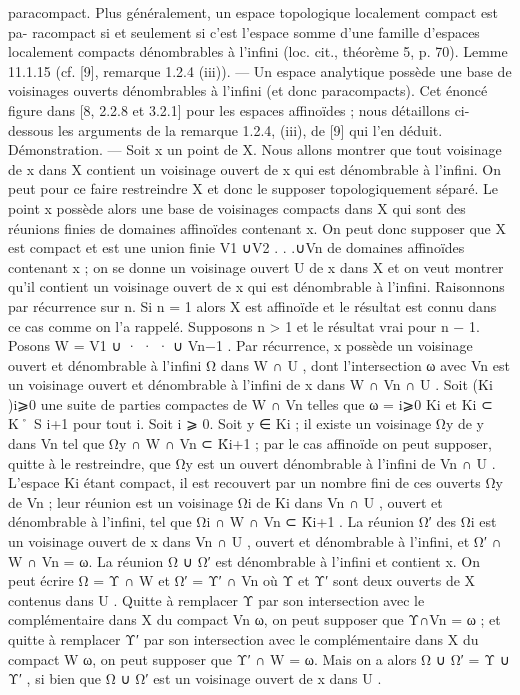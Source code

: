\documentclass[
  10pt,
]{article}
\newenvironment{Shaded}{}{}
\newcommand{\NormalTok}[1]{#1}
\begin{document}
\begin{Shaded}
\begin{Highlighting}[]
\NormalTok{paracompact. Plus généralement, un espace topologique localement compact est pa{-}}
\NormalTok{racompact si et seulement si c’est l’espace somme d’une famille d’espaces localement}
\NormalTok{compacts dénombrables à l’infini (loc. cit., théorème 5, p. 70).}
\NormalTok{Lemme 11.1.15 (cf. [9], remarque 1.2.4 (iii)). — Un espace analytique possède}
\NormalTok{une base de voisinages ouverts dénombrables à l’infini (et donc paracompacts).}
\NormalTok{   Cet énoncé figure dans [8, 2.2.8 et 3.2.1] pour les espaces affinoïdes ; nous détaillons}
\NormalTok{ci{-}dessous les arguments de la remarque 1.2.4, (iii), de [9] qui l’en déduit.}
\NormalTok{Démonstration. — Soit x un point de X. Nous allons montrer que tout voisinage de x}
\NormalTok{dans X contient un voisinage ouvert de x qui est dénombrable à l’infini. On peut pour}
\NormalTok{ce faire restreindre X et donc le supposer topologiquement séparé. Le point x possède}
\NormalTok{alors une base de voisinages compacts dans X qui sont des réunions finies de domaines}
\NormalTok{affinoïdes contenant x. On peut donc supposer que X est compact et est une union finie}
\NormalTok{V1 ∪V2 . . .∪Vn de domaines affinoïdes contenant x ; on se donne un voisinage ouvert U de}
\NormalTok{x dans X et on veut montrer qu’il contient un voisinage ouvert de x qui est dénombrable}
\NormalTok{à l’infini. Raisonnons par récurrence sur n. Si n = 1 alors X est affinoïde et le résultat}
\NormalTok{est connu dans ce cas comme on l’a rappelé. Supposons n \textgreater{} 1 et le résultat vrai pour}
\NormalTok{n − 1. Posons W = V1 ∪ · · · ∪ Vn−1 . Par récurrence, x possède un voisinage ouvert et}
\NormalTok{dénombrable à l’infini Ω dans W ∩ U , dont l’intersection ω avec Vn est un voisinage}
\NormalTok{ouvert et dénombrable à l’infini de x dans W ∩ Vn ∩ U . Soit (Ki )i⩾0 une suite de parties}
\NormalTok{compactes de W ∩ Vn telles que ω = i⩾0 Ki et Ki ⊂ K˚}
\NormalTok{                                       S}
\NormalTok{                                                           i+1 pour tout i. Soit i ⩾ 0. Soit}
\NormalTok{y ∈ Ki ; il existe un voisinage Ωy de y dans Vn tel que Ωy ∩ W ∩ Vn ⊂ K̊i+1 ; par le cas}
\NormalTok{affinoïde on peut supposer, quitte à le restreindre, que Ωy est un ouvert dénombrable}
\NormalTok{à l’infini de Vn ∩ U . L’espace Ki étant compact, il est recouvert par un nombre fini de}
\NormalTok{ces ouverts Ωy de Vn ; leur réunion est un voisinage Ωi de Ki dans Vn ∩ U , ouvert et}
\NormalTok{dénombrable à l’infini, tel que Ωi ∩ W ∩ Vn ⊂ K̊i+1 . La réunion Ω′ des Ωi est un voisinage}
\NormalTok{ouvert de x dans Vn ∩ U , ouvert et dénombrable à l’infini, et Ω′ ∩ W ∩ Vn = ω. La réunion}
\NormalTok{Ω ∪ Ω′ est dénombrable à l’infini et contient x. On peut écrire Ω = Υ ∩ W et Ω′ = Υ′ ∩ Vn}
\NormalTok{où Υ et Υ′ sont deux ouverts de X contenus dans U . Quitte à remplacer Υ par son}
\NormalTok{intersection avec le complémentaire dans X du compact Vn ω, on peut supposer que}
\NormalTok{Υ∩Vn = ω ; et quitte à remplacer Υ′ par son intersection avec le complémentaire dans X}
\NormalTok{du compact W ω, on peut supposer que Υ′ ∩ W = ω. Mais on a alors Ω ∪ Ω′ = Υ ∪ Υ′ ,}
\NormalTok{si bien que Ω ∪ Ω′ est un voisinage ouvert de x dans U .}





\end{Highlighting}
\end{Shaded}
\end{document}
